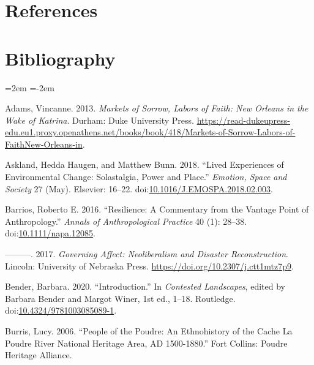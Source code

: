 \documentclass[
]{article}
\newlength{\cslhangindent}
\newenvironment{CSLReferences}[2] %
 {\begin{list}{}{%
  \setlength{\itemindent}{0pt}
  \setlength{\leftmargin}{0pt}
  \setlength{\parsep}{0pt}
  \ifodd #1
   \setlength{\leftmargin}{\cslhangindent}
   \setlength{\itemindent}{-1\cslhangindent}
  \fi
  \setlength{\itemsep}{#2\baselineskip}}}
 {\end{list}}
\begin{document}
\section{References}\label{references-4}

\clearpage

\section*{Bibliography}

\noindent
\leftskip=2em
\parindent=-2em

\label{refs}
\begin{CSLReferences}{1}{0}
Adams, Vincanne. 2013. \emph{Markets of {Sorrow}, {Labors} of {Faith}: {New Orleans} in the {Wake} of {Katrina}}. Durham: Duke University Press. \url{https://read-dukeupress-edu.eu1.proxy.openathens.net/books/book/418/Markets-of-Sorrow-Labors-of-FaithNew-Orleans-in}.

Askland, Hedda Haugen, and Matthew Bunn. 2018. {``Lived Experiences of Environmental Change: {Solastalgia}, Power and Place.''} \emph{Emotion, Space and Society} 27 (May). Elsevier: 16--22. doi:\href{https://doi.org/10.1016/J.EMOSPA.2018.02.003}{10.1016/J.EMOSPA.2018.02.003}.

Barrios, Roberto E. 2016. {``Resilience: {A} Commentary from the Vantage Point of Anthropology.''} \emph{Annals of Anthropological Practice} 40 (1): 28--38. doi:\href{https://doi.org/10.1111/napa.12085}{10.1111/napa.12085}.

---------. 2017. \emph{Governing {Affect}: {Neoliberalism} and {Disaster Reconstruction}}. Lincoln: University of Nebraska Press. \url{https://doi.org/10.2307/j.ctt1mtz7p9}.

Bender, Barbara. 2020. {``Introduction.''} In \emph{Contested {Landscapes}}, edited by Barbara Bender and Margot Winer, 1st ed., 1--18. Routledge. doi:\href{https://doi.org/10.4324/9781003085089-1}{10.4324/9781003085089-1}.

Burris, Lucy. 2006. {``People of the {Poudre}: {An Ethnohistory} of the {Cache} La {Poudre River National Heritage Area}, {AD} 1500-1880.''} Fort Collins: Poudre Heritage Alliance.


\end{CSLReferences}
\end{document}
